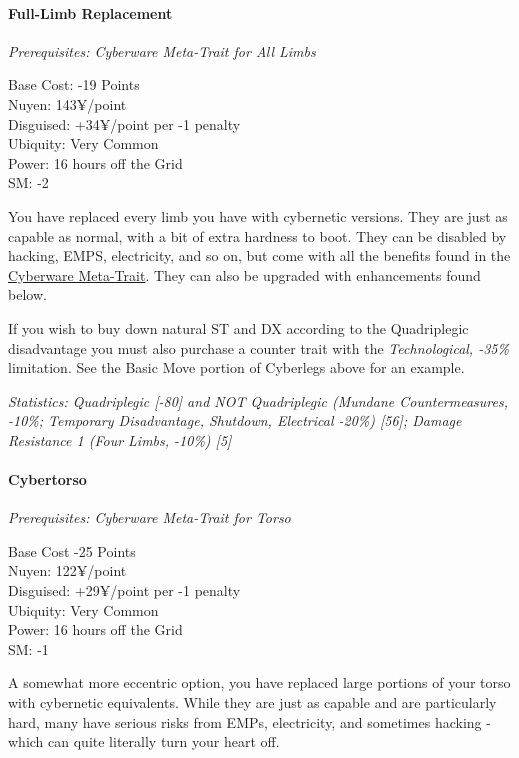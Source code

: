 \begin{multicols*}{3}
	\paragraph{Full-Limb Replacement}
	\textit{Prerequisites:  Cyberware Meta-Trait for All Limbs}
	\begin{flushright}
		Base Cost: -19 Points\\
		Nuyen: 143¥/point\\
		Disguised: +34¥/point per -1 penalty\\
		Ubiquity: Very Common\\
		Power: 16 hours off the Grid\\
		SM: -2
	\end{flushright}
	
	You have replaced every limb you have with cybernetic versions. They are just as capable as normal, with a bit of extra hardness to boot. They can be disabled by hacking, EMPS, electricity, and so on, but come with all the benefits found in the \hyperref[cyberware-meta-trait]{Cyberware Meta-Trait}. They can also be upgraded with enhancements found below.
	
	If you wish to buy down natural ST and DX according to the Quadriplegic disadvantage you must also purchase a counter trait with the \textit{Technological, -35\%} limitation. See the Basic Move portion of Cyberlegs above for an example.
	
	\textit{\textcolor{OliveGreen}{Statistics: Quadriplegic [-80] and NOT Quadriplegic (Mundane Countermeasures, -10\%; Temporary Disadvantage, Shutdown, Electrical -20\%) [56]; Damage Resistance 1 (Four Limbs, -10\%) [5]}}
	
	\paragraph{Cybertorso}
	\textit{Prerequisites:  Cyberware Meta-Trait for Torso}
	\begin{flushright}
		Base Cost -25 Points\\
		Nuyen: 122¥/point\\
		Disguised: +29¥/point per -1 penalty\\
		Ubiquity: Very Common\\
		Power: 16 hours off the Grid\\
		SM: -1
	\end{flushright}

	A somewhat more eccentric option, you have replaced large portions of your torso with cybernetic equivalents. While they are just as capable and are particularly hard, many have serious risks from EMPs, electricity, and sometimes hacking - which can quite literally turn your heart off.
	

\end{multicols*}
